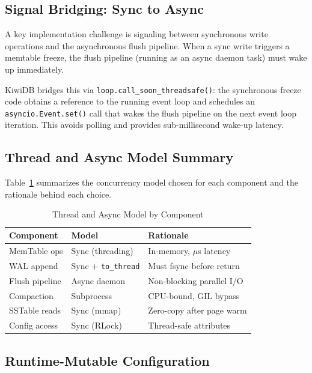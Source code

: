 \documentclass[conference]{IEEEtran}
\begin{document}
\subsection{Signal Bridging: Sync to Async}

A key implementation challenge is signaling between synchronous write operations and the asynchronous flush pipeline. When a sync write triggers a memtable freeze, the flush pipeline (running as an async daemon task) must wake up immediately.

KiwiDB bridges this via \texttt{loop.call\_soon\_threadsafe()}: the synchronous freeze code obtains a reference to the running event loop and schedules an \texttt{asyncio.Event.set()} call that wakes the flush pipeline on the next event loop iteration. This avoids polling and provides sub-millisecond wake-up latency.

\subsection{Thread and Async Model Summary}

Table~\ref{tab:threading} summarizes the concurrency model chosen for each component and the rationale behind each choice.

\begin{table}[H]
\centering
\caption{Thread and Async Model by Component}
\label{tab:threading}
\begin{tabular}{@{}lll@{}}
\toprule
\textbf{Component} & \textbf{Model} & \textbf{Rationale} \\
\midrule
MemTable ops & Sync (threading) & In-memory, $\mu$s latency \\
WAL append & Sync + \texttt{to\_thread} & Must fsync before return \\
Flush pipeline & Async daemon & Non-blocking parallel I/O \\
Compaction & Subprocess & CPU-bound, GIL bypass \\
SSTable reads & Sync (mmap) & Zero-copy after page warm \\
Config access & Sync (RLock) & Thread-safe attributes \\
\bottomrule
\end{tabular}
\end{table}

\subsection{Runtime-Mutable Configuration}
\end{document}
